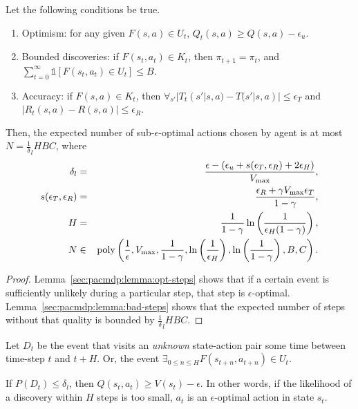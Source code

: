 \begin{thm}
Let the following conditions be true.
\begin{enumerate}
\item
\label{sec:pacmdp:cond:opt}
Optimism: for any given $F(s,a) \in U_t$, $Q_t(s,a) \geq Q(s,a) - \epsilon_u$.
\item
\label{sec:pacmdp:cond:bounded}
Bounded discoveries: if $F(s_t, a_t) \in K_t$, then $\pi_{t+1} = \pi_{t}$, and $\sum_{t=0}^\infty \mathbb{1}\left[F(s_t,a_t) \in U_t\right] \leq B$.
\item
\label{sec:pacmdp:cond:acc}
Accuracy: if $F(s,a) \in K_t$, then $\forall_{s'}|T_t(s'|s,a)-T(s'|s,a)| \leq \epsilon_T$ and $|R_t(s,a)-R(s,a)|\leq\epsilon_R$.
\end{enumerate}
Then, the expected number of sub-$\epsilon$-optimal actions chosen by agent \A is at most $N = \frac 1 \delta_l H B C$, where
\begin{eqnarray}
\delta_l &=& \frac {\epsilon - (\epsilon_u + s(\epsilon_T,\epsilon_R) +2 \epsilon_H)} {V_{\rm max}},\\
s(\epsilon_T,\epsilon_R) &=& \frac {\epsilon_R + \gamma V_{\rm max} \epsilon_T} {1-\gamma},\\
H&=&\frac 1 {1-\gamma} \ln\left(\frac 1 {\epsilon_H (1-\gamma)}\right),\\
N&\in&\mbox{poly}\left(\frac 1 \epsilon, V_{\rm max}, \frac{1}{1-\gamma}, \ln\left(\frac 1 {\epsilon_H}\right), \ln \left(\frac{1}{1-\gamma}\right), B, C\right).
\end{eqnarray}
\end{thm}

\begin{proof}
Lemma~\ref{sec:pacmdp:lemma:opt-steps} shows that if a certain event is sufficiently unlikely during a particular step, that step is $\epsilon$-optimal. Lemma~\ref{sec:pacmdp:lemma:bad-steps} shows that the expected number of steps without that quality is bounded by $\frac 1 \delta_l H B C$.
\end{proof}

\begin{defn}
Let $D_t$ be the event that \A visits an \emph{unknown} state-action pair some time between time-step $t$ and $t+H$. Or, the event $\exists_{0\leq n\leq H} F(s_{t+n},a_{t+n}) \in U_t$.
\end{defn}

\begin{lemma}
\label{sec:pacmdp:lemma:opt-steps}
If $P(D_t) \leq \delta_l$, then $Q(s_t,a_t) \geq V(s_t) - \epsilon$. In other words, if the likelihood of a discovery within $H$ steps is too small, $a_t$ is an $\epsilon$-optimal action in state $s_t$.
\end{lemma}

